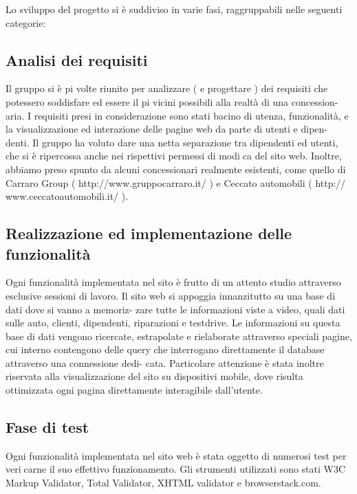 Lo sviluppo del progetto si è suddiviso in varie fasi, raggruppabili nelle seguenti
categorie:

\subsection{Analisi dei requisiti}

Il gruppo si è pi volte riunito per analizzare ( e progettare ) dei requisiti che
potessero soddisfare ed essere il pi vicini possibili alla realtà di una concession-
aria. I requisiti presi in considerazione sono stati bacino di utenza, funzionalità,
e la visualizzazione ed interazione delle pagine web da parte di utenti e dipen-
denti. Il gruppo ha voluto dare una netta separazione tra dipendenti ed utenti, che si è ripercossa anche nei rispettivi permessi di modica del sito web. Inoltre,
abbiamo preso spunto da alcuni concessionari realmente esistenti, come quello di
Carraro Group ( http://www.gruppocarraro.it/ ) e Ceccato automobili ( http://
www.ceccatoautomobili.it/ ).

\subsection{Realizzazione ed implementazione delle funzionalità}

Ogni funzionalità implementata nel sito è frutto di un attento studio attraverso
esclusive sessioni di lavoro.
Il sito web si appoggia innanzitutto su una base di dati dove si vanno a memoriz-
zare tutte le informazioni viste a video, quali dati sulle auto, clienti, dipendenti,
riparazioni e testdrive. Le informazioni su questa base di dati vengono ricercate,
estrapolate e rielaborate attraverso speciali pagine, cui interno contengono delle
query che interrogano direttamente il database attraverso una connessione dedi-
cata.
Particolare attenzione è stata inoltre riservata alla visualizzazione del sito su
dispositivi mobile, dove risulta ottimizzata ogni pagina direttamente interagibile
dall'utente.

\subsection{Fase di test}

Ogni funzionalità implementata nel sito web è stata oggetto di numerosi test per
vericarne il suo effettivo funzionamento. Gli strumenti utilizzati sono stati W3C
Markup Validator, Total Validator, XHTML validator e browserstack.com.

